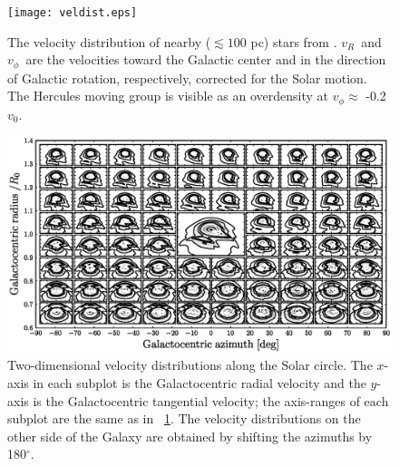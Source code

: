 \documentclass[12pt,preprint]{aastex}
\newcommand{\vR}{\ensuremath{v_R}}
\newcommand{\vphi}{\ensuremath{v_{\phi}}}
\newcommand{\vo}{\ensuremath{v_0}}
\begin{document}
\clearpage
\begin{figure}
\texttt{[image: veldist.eps]}
\caption{The velocity distribution of nearby ($\lesssim 100$ pc) stars
  from \citet{Bovy09a}. \vR\ and \vphi\ are the velocities toward the
  Galactic center and in the direction of Galactic rotation,
  respectively, corrected for the Solar motion. The Hercules moving
  group is visible as an overdensity at \vphi $\approx$ -0.2
  $\vo$.}\label{fig:obs}
\end{figure}

\clearpage
\begin{figure}
\includegraphics[width=\textwidth]{rphi2d.ps}
\caption{Two-dimensional velocity distributions along the Solar
  circle. The $x$-axis in each subplot is the Galactocentric radial
  velocity and the $y$-axis is the Galactocentric tangential velocity;
  the axis-ranges of each subplot are the same as in
  \figurename~\ref{fig:obs}. The velocity distributions on the other
  side of the Galaxy are obtained by shifting the azimuths by
  180$^{\circ}$.}\label{fig:rphi2d}
\end{figure}
\end{document}
